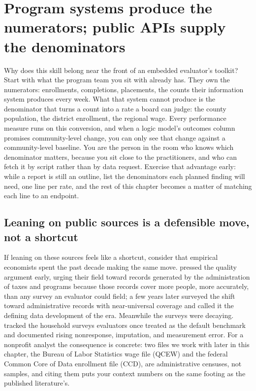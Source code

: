 \documentclass[
    a4paper,
    fontsize=10pt,
    twoside=true,
    numbers=noenddot,
]{kaobook}
\begin{document}
\section{Program systems produce the numerators; public APIs supply the denominators}\label{ch03-advantage}
Why does this skill belong near the front of an embedded evaluator's toolkit? Start with what the program team you sit with already has. They own the numerators: enrollments, completions, placements, the counts their information system produces every week. What that system cannot produce is the denominator that turns a count into a rate a board can judge: the county population, the district enrollment, the regional wage. Every performance measure runs on this conversion, and when a logic model's outcomes column promises community-level change, you can only see that change against a community-level baseline. You are the person in the room who knows which denominator matters, because you sit close to the practitioners, and who can fetch it by script rather than by data request. Exercise that advantage early: while a report is still an outline, list the denominators each planned finding will need, one line per rate, and the rest of this chapter becomes a matter of matching each line to an endpoint.

\subsection{Leaning on public sources is a defensible move, not a shortcut}\label{ch03-defensible}
If leaning on these sources feels like a shortcut, consider that empirical economists spent the past decade making the same move. \textcite{card2010administrative} pressed the quality argument early, urging their field toward records generated by the administration of taxes and programs because those records cover more people, more accurately, than any survey an evaluator could field; a few years later \textcite{einav2014bigdata} surveyed the shift toward administrative records with near-universal coverage and called it the defining data development of the era. Meanwhile the surveys were decaying. \textcite{meyer2015surveys} tracked the household surveys evaluators once treated as the default benchmark and documented rising nonresponse, imputation, and measurement error. For a nonprofit analyst the consequence is concrete: two files we work with later in this chapter, the Bureau of Labor Statistics wage file (QCEW) and the federal Common Core of Data enrollment file (CCD), are administrative censuses, not samples, and citing them puts your context numbers on the same footing as the published literature's.
\end{document}
